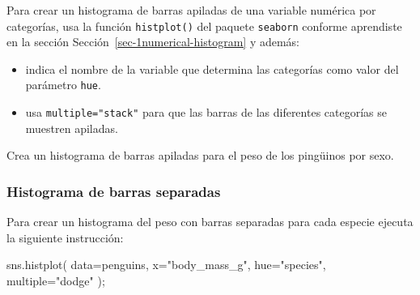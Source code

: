 \documentclass[
  a4paper,
  noprof,
  12pt,
  notoc,
  nosols,
  nobib]{mnye}
\newenvironment{Shaded}{\begin{snugshade}}{\end{snugshade}}
\newcommand{\NormalTok}[1]{\textcolor[rgb]{0.00,0.23,0.31}{#1}}
\newcommand{\OperatorTok}[1]{\textcolor[rgb]{0.37,0.37,0.37}{#1}}
\newcommand{\StringTok}[1]{\textcolor[rgb]{0.13,0.47,0.30}{#1}}
\providecommand{\tightlist}{%
  \setlength{\itemsep}{0pt}\setlength{\parskip}{0pt}}\usepackage{longtable,booktabs,array}
\renewenvironment{exercise}[1][]{
            \if\relax\detokenize{#1}\relax
                \ex
            \else
                \ex[note={#1}]
            \fi
        }{\endex}
\theoremstyle{definition}
\newtheorem{exercise}{Ejercicio}[section]
\theoremstyle{remark}
\begin{document}
\begin{tcolorbox}[enhanced jigsaw, arc=.35mm, colback=white, colframe=quarto-callout-note-color-frame, breakable, opacityback=0, bottomrule=.15mm, rightrule=.15mm, left=2mm, toprule=.15mm, leftrule=.75mm]
\begin{minipage}[t]{5.5mm}
\textcolor{quarto-callout-note-color}{\faInfo}
\end{minipage}%
\begin{minipage}[t]{\textwidth - 5.5mm}

Para crear un histograma de barras apiladas de una variable numérica por
categorías, usa la función \texttt{histplot()} del paquete
\texttt{seaborn} conforme aprendiste en la sección
Sección~\ref{sec-1numerical-histogram} y además:

\begin{itemize}
\tightlist
\item
  indica el nombre de la variable que determina las categorías como
  valor del parámetro \texttt{hue}.
\item
  usa \texttt{multiple="stack"} para que las barras de las diferentes
  categorías se muestren apiladas.
\end{itemize}

\end{minipage}%
\end{tcolorbox}

\begin{exercise}[]%
\protect\hypertarget{exr-histogram-stack}{}\label{exr-histogram-stack}%
Crea un histograma de barras apiladas para el peso de los pingüinos por
sexo.

\end{exercise}

\hypertarget{histograma-de-barras-separadas}{%
\subsubsection{Histograma de barras
separadas}\label{histograma-de-barras-separadas}}

Para crear un histograma del peso con barras separadas para cada especie
ejecuta la siguiente instrucción:

\begin{Shaded}
\begin{Highlighting}[]
\NormalTok{sns.histplot(}
\NormalTok{    data}\OperatorTok{=}\NormalTok{penguins,  }
\NormalTok{    x}\OperatorTok{=}\StringTok{"body\_mass\_g"}\NormalTok{, }
\NormalTok{    hue}\OperatorTok{=}\StringTok{"species"}\NormalTok{,}
\NormalTok{    multiple}\OperatorTok{=}\StringTok{"dodge"}
\NormalTok{)}\OperatorTok{;}
\end{Highlighting}
\end{Shaded}
\end{document}
